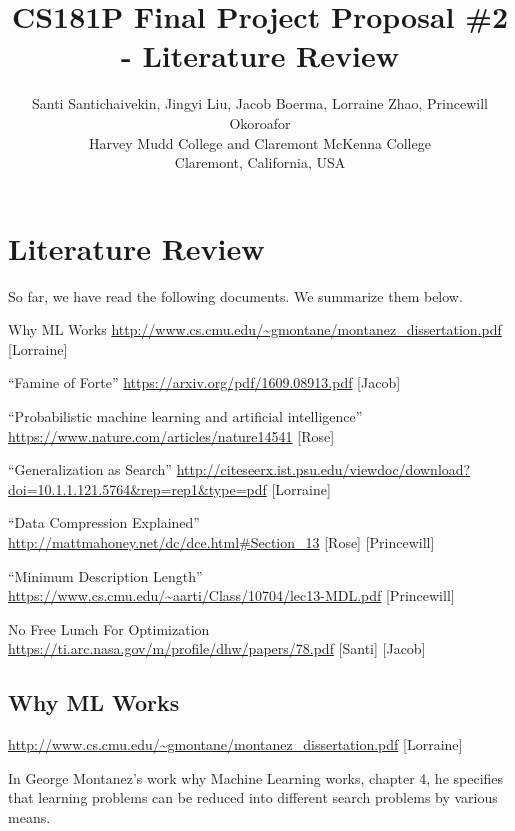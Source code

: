 \documentclass[12pt]{article}
\begin{document}
\title{CS181P Final Project Proposal \#2 - Literature Review}

\author{
Santi Santichaivekin, Jingyi Liu, Jacob Boerma, Lorraine Zhao, Princewill Okoroafor\\
Harvey Mudd College and Claremont McKenna College\\
Claremont, California, USA\\
}

\maketitle

\section{Literature Review}

So far, we have read the following documents. We summarize them below.

\bigskip

Why ML Works
\url{http://www.cs.cmu.edu/~gmontane/montanez_dissertation.pdf} [Lorraine]

“Famine of Forte”
\url{https://arxiv.org/pdf/1609.08913.pdf} [Jacob]

“Probabilistic machine learning and artificial intelligence”
\url{https://www.nature.com/articles/nature14541} [Rose]

“Generalization as Search”
\url{http://citeseerx.ist.psu.edu/viewdoc/download?doi=10.1.1.121.5764&rep=rep1&type=pdf} [Lorraine]

“Data Compression Explained” 
\url{http://mattmahoney.net/dc/dce.html#Section_13} [Rose] [Princewill]

“Minimum Description Length” 
\url{https://www.cs.cmu.edu/~aarti/Class/10704/lec13-MDL.pdf} [Princewill]

No Free Lunch For Optimization
\url{https://ti.arc.nasa.gov/m/profile/dhw/papers/78.pdf} [Santi] [Jacob]	

\newpage

\subsection*{Why ML Works} 

\url{http://www.cs.cmu.edu/~gmontane/montanez_dissertation.pdf} [Lorraine]


	In George Montanez’s work why Machine Learning works, chapter 4, he specifies that learning problems can be reduced into different search problems by various means. 
	
\end{document}
